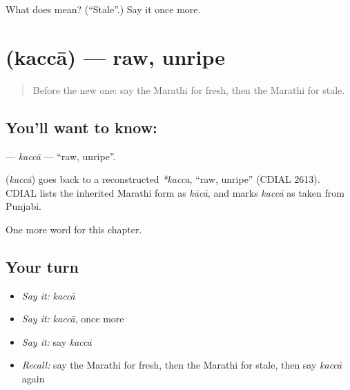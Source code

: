 \begin{tcolorbox}[breakable,colback=teal!4,colframe=teal!35!black,title={Before you move on}]
What does  mean? (\textquotedblleft{}Stale\textquotedblright{}.) Say it once more.
\end{tcolorbox}
\section[\texorpdfstring{\mr{कच्चा} (kaccā)}{कच्चा (kaccā)}]{ (kaccā) — raw, unripe}

\label{lesson:MR-C150-kacca}



\begin{quote}
Before the new one: say the Marathi for fresh, then the Marathi for stale.
\end{quote}

\subsection*{You'll want to know: }
\textbf{} — \emph{kaccā} — \textquotedblleft{}raw, unripe\textquotedblright{}.

\begin{cousinweb}
\textbf{} (\emph{kaccā}) goes back to a reconstructed \emph{*kacca}, \textquotedblleft{}raw, unripe\textquotedblright{} (CDIAL 2613). CDIAL lists the inherited Marathi form as \emph{kācā}, and marks \emph{kaccā} as taken from Punjabi.
\end{cousinweb}

\begin{grammarlens}[title={What you've built}]
One more word for this chapter.
\end{grammarlens}

\subsection*{Your turn}
\begin{itemize}
\raggedright
  \item \emph{Say it:} \emph{kaccā}
  \item \emph{Say it:} \emph{kaccā}, once more
  \item \emph{Say it:} say \emph{kaccā}
  \item \emph{Recall:} say the Marathi for fresh, then the Marathi for stale, then say \emph{kaccā} again
\end{itemize}

